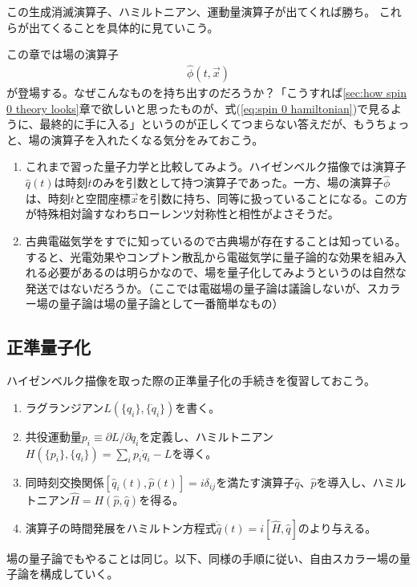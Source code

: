 \documentclass[10pt,a4paper]{jarticle}
\begin{document}
この生成消滅演算子、ハミルトニアン、運動量演算子が出てくれば勝ち。
これらが出てくることを具体的に見ていこう。

この章では場の演算子
\begin{align}
\hat\phi(t,\vec x)
\end{align}
が登場する。なぜこんなものを持ち出すのだろうか？「こうすれば\ref{sec:how spin 0 theory looks}章で欲しいと思ったものが、式(\ref{eq:spin 0 hamiltonian})で見るように、最終的に手に入る」というのが正しくてつまらない答えだが、もうちょっと、場の演算子を入れたくなる気分をみておこう。

\begin{enumerate}
\item これまで習った量子力学と比較してみよう。ハイゼンベルク描像では演算子$\hat q(t)$は時刻$t$のみを引数として持つ演算子であった。一方、場の演算子$\hat\phi$は、時刻$t$と空間座標$\vec x$を引数に持ち、同等に扱っていることになる。この方が特殊相対論すなわちローレンツ対称性と相性がよさそうだ。
\item 古典電磁気学をすでに知っているので古典場が存在することは知っている。すると、光電効果やコンプトン散乱から電磁気学に量子論的な効果を組み入れる必要があるのは明らかなので、場を量子化してみようというのは自然な発送ではないだろうか。（ここでは電磁場の量子論は議論しないが、スカラー場の量子論は場の量子論として一番簡単なもの）
\end{enumerate}



\subsection{正準量子化}
ハイゼンベルク描像を取った際の正準量子化の手続きを復習しておこう。
\begin{enumerate}
\item ラグランジアン$L(\{q_i \}, \{\dot q_i\})$を書く。
\item 共役運動量$p_i \equiv \partial L / \partial \dot q_i$を定義し、ハミルトニアン$H(\{p_i\}, \{q_i\}) = \sum_i p_i \dot q_i - L$を導く。
\item 同時刻交換関係$[\hat q_i(t), \hat p(t)] = i\delta_{ij}$を満たす演算子$\hat q$、$\hat p$を導入し、ハミルトニアン$\hat H = H(\hat p, \hat q)$を得る。
\item 演算子の時間発展をハミルトン方程式$\dot{\hat q}(t) = i[\hat H, \hat q]$のより与える。
\end{enumerate}
場の量子論でもやることは同じ。以下、同様の手順に従い、自由スカラー場の量子論を構成していく。
\end{document}
